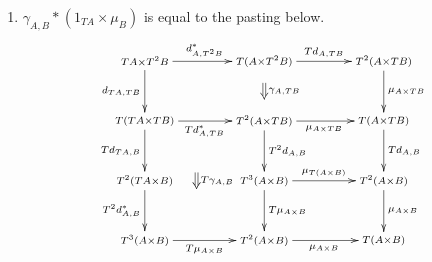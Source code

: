 \begin{Defi}
\begin{enumerate}
\[                (90,-15)*+{\scriptstyle T^2(A \times B)}="31";
                (0,-30)*+{\scriptstyle T^2(TA \times B)}="02";
                (30,-30)*+{\scriptstyle T(TA \times B)}="12";
                (60,-30)*+{\scriptstyle T^2(A \times B)}="22";
                (90,-30)*+{\scriptstyle T(A \times B)}="32";
                {\ar^{d^{\ast}_{TA,TB}} "00" ; "10"};
                {\ar^{Td^{\ast}_{A,TB}} "10" ; "20"};
                {\ar^{T^2 d_{A,B}} "20" ; "30"};
                {\ar_{d_{T^2A,B}} "00" ; "01"};
                {\ar_{Td_{TA,B}} "10" ; "11"};
                {\ar^{T\mu_{A \times B}} "30" ; "31"};
                {\ar_{T^2 d^{\ast}_{A,B}} "11" ; "21"};
                {\ar_{T\mu_{A \times B}} "21" ; "31"};
                {\ar_{Td^{\ast}_{TA,B}} "01" ; "02"};
                {\ar_{\mu_{TA \times B}} "11" ; "12"};
                {\ar_{\mu_{T(A \times B)}} "21" ; "22"};
                {\ar^{\mu_{A \times B}} "31" ; "32"};
                {\ar_{\mu_{TA \times B}} "02" ; "12"};
                {\ar_{Td^{\ast}_{A,B}} "12" ; "22"};
                {\ar_{\mu_{A \times B}} "22" ; "32"};
                {\ar@{=>}^{T\gamma_{A,B}} (60,-5.5) ; (60,-9.5)};
                {\ar@{=>}^{\gamma_{TA,B}} (12.5,-13) ; (12.5,-17)};
            \endxy
          \]
        \item\label{axiom:ps_comm_mult_2} $\gamma_{A,B} * (1_{TA} \times \mu_B)$ is equal to the pasting below.
          \[
            \xy
                (0,0)*+{\scriptstyle TA \times T^2B}="00";
                (30,0)*+{\scriptstyle T(A \times T^2B)}="10";
                (60,0)*+{\scriptstyle T^2(A \times TB)}="20";
                (0,-15)*+{\scriptstyle T(TA \times TB)}="01";
                (30,-15)*+{\scriptstyle T^2(A \times TB)}="11";
                (60,-15)*+{\scriptstyle T(A \times TB)}="21";
                (0,-30)*+{\scriptstyle T^2(TA \times B)}="02";
                (30,-30)*+{\scriptstyle T^3(A \times B)}="12";
                (60,-30)*+{\scriptstyle T^2(A \times B)}="22";
                (0,-45)*+{\scriptstyle T^3(A \times B)}="03";
                (30,-45)*+{\scriptstyle T^2(A \times B)}="13";
                (60,-45)*+{\scriptstyle T(A \times B)}="23";
                {\ar^{d^{\ast}_{A,T^2B}} "00" ; "10"};
                {\ar^{Td_{A,TB}} "10" ; "20"};
                {\ar_{d_{TA,TB}} "00" ; "01"};
                {\ar^{\mu_{A \times TB}} "20" ; "21"};
                {\ar_{Td^{\ast}_{A,TB}} "01" ; "11"};
                {\ar_{\mu_{A \times TB}} "11" ; "21"};
                {\ar_{Td_{TA,B}} "01" ; "02"};
                {\ar^{T^2 d_{A,B}} "11" ; "12"};
                {\ar^{Td_{A,B}} "21" ; "22"};
                {\ar^{\mu_{T(A \times B)}} "12" ; "22"};
                {\ar_{T^2 d^{\ast}_{A,B}} "02" ; "03"};
                {\ar^{T\mu_{A \times B}} "12" ; "13"};
                {\ar^{\mu_{A \times B}} "22" ; "23"};
                {\ar_{T\mu_{A \times B}} "03" ; "13"};
                {\ar_{\mu_{A \times B}} "13" ; "23"};
                {\ar@{=>}^{T\gamma_{A,B}} (13,-28) ; (13,-32)};
                {\ar@{=>}^{\gamma_{A,TB}} (30,-5.5) ; (30,-9.5)};
            \endxy
          \]
    \end{enumerate}
\end{Defi}

